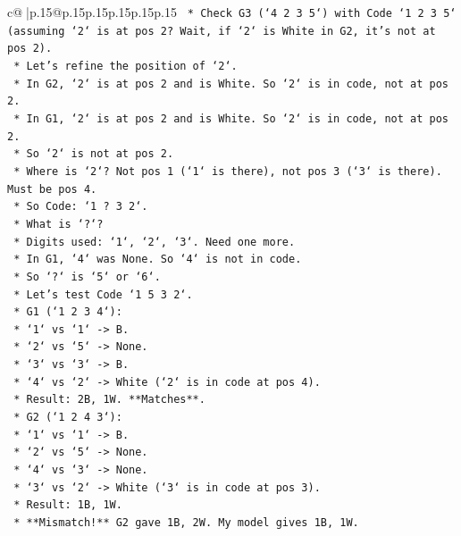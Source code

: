 \documentclass{article}
\begin{document}
{\begin{supertabular}{c@{$\;$}|p{.15\linewidth}@{}p{.15\linewidth}p{.15\linewidth}p{.15\linewidth}p{.15\linewidth}p{.15\linewidth}}
{{{\texttt{        *   Check G3 (`4 2 3 5`) with Code `1 2 3 5` (assuming `2` is at pos 2? Wait, if `2` is White in G2, it's not at pos 2).} \\
\texttt{            *   Let's refine the position of `2`.} \\
\texttt{            *   In G2, `2` is at pos 2 and is White. So `2` is in code, not at pos 2.} \\
\texttt{            *   In G1, `2` is at pos 2 and is White. So `2` is in code, not at pos 2.} \\
\texttt{            *   So `2` is not at pos 2.} \\
\texttt{            *   Where is `2`? Not pos 1 (`1` is there), not pos 3 (`3` is there). Must be pos 4.} \\
\texttt{            *   So Code: `1 ? 3 2`.} \\
\texttt{            *   What is `?`?} \\
\texttt{            *   Digits used: `1`, `2`, `3`. Need one more.} \\
\texttt{            *   In G1, `4` was None. So `4` is not in code.} \\
\texttt{            *   So `?` is `5` or `6`.} \\
\texttt{            *   Let's test Code `1 5 3 2`.} \\
\texttt{                *   G1 (`1 2 3 4`):} \\
\texttt{                    *   `1` vs `1` {-}> B.} \\
\texttt{                    *   `2` vs `5` {-}> None.} \\
\texttt{                    *   `3` vs `3` {-}> B.} \\
\texttt{                    *   `4` vs `2` {-}> White (`2` is in code at pos 4).} \\
\texttt{                    *   Result: 2B, 1W. **Matches**.} \\
\texttt{                *   G2 (`1 2 4 3`):} \\
\texttt{                    *   `1` vs `1` {-}> B.} \\
\texttt{                    *   `2` vs `5` {-}> None.} \\
\texttt{                    *   `4` vs `3` {-}> None.} \\
\texttt{                    *   `3` vs `2` {-}> White (`3` is in code at pos 3).} \\
\texttt{                    *   Result: 1B, 1W.} \\
\texttt{                    *   **Mismatch!** G2 gave 1B, 2W. My model gives 1B, 1W.} \\
}}}
\end{supertabular}}
\end{document}

